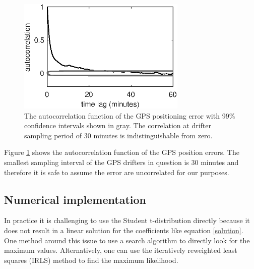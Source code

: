 \documentclass[twocol]{ametsoc}
\begin{document}
\begin{figure}
  \centerline{\includegraphics[width=19pc,angle=0]{gps_autocorrelation}}
  \caption{The autocorrelation function of the GPS positioning error with 99\% confidence intervals shown in gray. The correlation at drifter sampling period of 30 minutes is indistinguishable from zero.}
  \label{gps_autocorrelation}
\end{figure}

Figure \ref{gps_autocorrelation} shows the autocorrelation function of the GPS position errors. The smallest sampling interval of the GPS drifters in question is 30 minutes and therefore it is safe to assume the error are uncorrelated for our purposes.

%
\subsection{Numerical implementation}
%

In practice it is challenging to use the Student t-distribution directly because it does not result in a linear solution for the coefficients like equation \ref{solution}. One method around this issue to use a search algorithm to directly look for the maximum values. Alternatively, one can use the iteratively reweighted least squares (IRLS) method to find the maximum likelihood.
\end{document}
